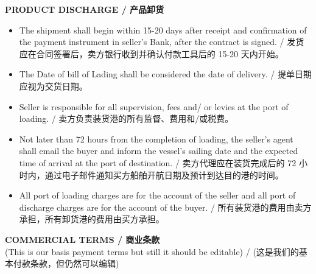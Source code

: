 \documentclass[a4paper,11pt]{article}
\begin{document}
\vspace{0.3cm}

\begin{center}{\large\textbf{\color{marooncolor}PRODUCT DISCHARGE / 产品卸货}}\end{center}
\vspace{0.1cm}
\begin{itemize}[leftmargin=1.5em, itemsep=2pt, topsep=2pt]
\item The shipment shall begin within 15-20 days after receipt and confirmation of the payment instrument in seller's Bank, after the contract is signed. / 发货应在合同签署后，卖方银行收到并确认付款工具后的 15-20 天内开始。
\item The Date of bill of Lading shall be considered the date of delivery. / 提单日期应视为交货日期。
\item Seller is responsible for all supervision, fees and/ or levies at the port of loading. / 卖方负责装货港的所有监督、费用和/或税费。
\item Not later than 72 hours from the completion of loading, the seller's agent shall email the buyer and inform the vessel's sailing date and the expected time of arrival at the port of destination. / 卖方代理应在装货完成后的 72 小时内，通过电子邮件通知买方船舶开航日期及预计到达目的港的时间。
\item All port of loading charges are for the account of the seller and all port of discharge charges are for the account of the buyer. / 所有装货港的费用由卖方承担，所有卸货港的费用由买方承担。
\end{itemize}

\newpage

\begin{center}
  {\large\textbf{\color{marooncolor}COMMERCIAL TERMS / 商业条款}}\\[4pt]
  {\small\color{marooncolor}(This is our basis payment terms but still it should be editable) / (这是我们的基本付款条款，但仍然可以编辑)}
\end{center}
\vspace{0.2cm}
\end{document}
